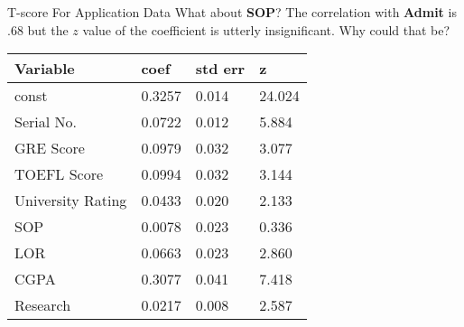 \documentclass[10pt, table, dvipsnames,xcdraw, handout ]{beamer}
\begin{document}
\begin{frame}[fragile]{T-score For Application Data}
What about \textbf{SOP}? The correlation with \textbf{Admit} is .68 but the $z$ value of the coefficient is utterly insignificant. Why could that be?
\begin{table}[]
\begin{tabular}{llll}
\hline
\textbf{Variable} & \textbf{coef} & \multicolumn{1}{c}{\textbf{std err}} & \textbf{z} \\ \hline
const             & 0.3257        & 0.014                                & 24.024     \\
Serial No.        & 0.0722        & 0.012                                & 5.884      \\
GRE Score         & 0.0979        & 0.032                                & 3.077      \\
TOEFL Score       & 0.0994        & 0.032                                & 3.144      \\
University Rating & 0.0433        & 0.020                                & 2.133      \\
SOP               & 0.0078        & 0.023                                & 0.336      \\
LOR               & 0.0663        & 0.023                                & 2.860      \\
CGPA              & 0.3077        & 0.041                                & 7.418      \\
Research          & 0.0217        & 0.008                                & 2.587     
\end{tabular}
\end{table}
\end{frame}
\end{document}
